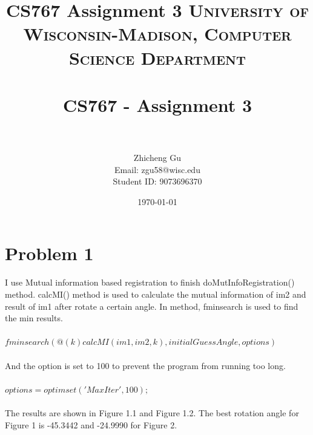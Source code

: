 \documentclass[paper=a4, fontsize=11pt]{scrartcl} %
\title{CS767 Assignment 3}
\title{	
	\normalfont \normalsize 
	\textsc{University of Wisconsin-Madison, Computer Science Department} \\ [25pt] %
	\horrule{0.5pt} \\[0.4cm] %
	\huge CS767 - Assignment 3 \\ %
	\horrule{2pt} \\[0.5cm] %
}
\author{Zhicheng Gu \\ Email: zgu58@wisc.edu \\ Student ID: 9073696370} %
\date{\normalsize\today} %
\numberwithin{equation}{section} %
\numberwithin{figure}{section} %
\numberwithin{table}{subsection} %
\begin{document}
	
	\maketitle %
	
	\renewcommand\thesubsection{\arabic{subsection}}
	
	\section{Problem 1}
	
	I use Mutual information based registration to finish doMutInfoRegistration() method.
	calcMI() method is used to calculate the mutual information 
	of im2 and result of im1 after rotate a certain angle.
	In  method, fminsearch is used to find the min results.
	\\\\
	$fminsearch(@(k)calcMI(im1,im2,k),initialGuessAngle, options)$
	\\\\
	And the option is set to 100 to prevent the program from running too long.
	\\\\
	$options = optimset('MaxIter',100);$
	\\\\
	
	The results are shown in Figure 1.1 and Figure 1.2. 
	The best rotation angle for Figure 1 is -45.3442 and -24.9990 for Figure 2.
	
	
	
\end{document}
